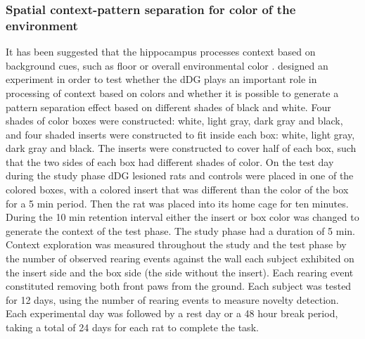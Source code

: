 \documentclass[doc, longtable]{apa6}
\begin{document}
\subsubsection{Spatial context-pattern separation for color of the environment}
It has been suggested that the hippocampus processes context based on background cues, such as floor or overall environmental color \parencite{Jeffery2003a, Norman2004a}. \textcite{kesner2016dentate} designed an experiment in order to test whether the dDG plays an important role in processing of context based on colors and whether it is possible to generate a pattern separation effect based on different shades of black and white. Four shades of color boxes were constructed: white, light gray, dark gray and black, and four shaded inserts were constructed to fit inside each box: white, light gray, dark gray and black. The inserts were constructed to cover half of each box, such that the two sides of each box had different shades of color. On the test day during the study phase dDG lesioned rats and controls were placed in one of the colored boxes, with a colored insert that was different than the color of the box for a 5 min period. Then the rat was placed into its home cage for ten minutes. During the 10 min retention interval either the insert or box color was changed to generate the context of the test phase. The study phase had a duration of 5 min. Context exploration was measured throughout the study and the test phase by the number of observed rearing events against the wall each subject exhibited on the insert side and the box side (the side without the insert). Each rearing event constituted removing both front paws from the ground. Each subject was tested for 12 days, using the number of rearing events to measure novelty detection. Each experimental day was followed by a rest day or a 48 hour break period, taking a total of 24 days for each rat to complete the task. 
\end{document}
